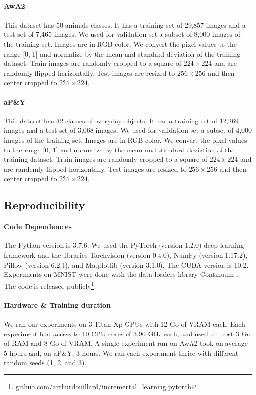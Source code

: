 \paragraph{AwA2} This dataset has 50 animals classes. It has a training set of 29,857 images and a
test set of 7,465 images. We used for validation set a subset of 8,000 images of the training set.
Images are in RGB color. We convert the pixel values to the range [0, 1] and normalize by the mean
and standard deviation of the training dataset. Train images are randomly cropped to a square of
$224\times224$ and are randomly flipped horizontally. Test images are resized to $256\times256$ and
then center cropped to $224\times224$.

\paragraph{aP\&Y} This dataset has 32 classes of everyday objects. It has a training set of 12,269
images and a test set of 3,068 images. We used for validation set a subset of 4,000 images of the
training set. Images are in RGB color. We convert the pixel values to the range [0, 1] and normalize
by the mean and standard deviation of the training dataset. Train images are randomly cropped to a
square of $224\times224$ and are randomly flipped horizontally. Test images are resized to
$256\times256$ and then center cropped to $224\times224$.

\subsection{Reproducibility}

\paragraph{Code Dependencies} The Python version is  3.7.6. We used the PyTorch
\citet{paszke2017pytorch} (version 1.2.0) deep learning framework and the libraries Torchvision
(version 0.4.0), NumPy \citet{oliphant2006numpy} (version 1.17.2), Pillow (version 6.2.1), and
Matplotlib \citet{hunter2007matplotlib} (version 3.1.0). The CUDA version is 10.2. Experiments on
MNIST were done with the data loaders library Continuum \citet{douillardlesort2021continuum}. The
code is released publicly\footnote{\href{https://github.com/arthurdouillard/incremental_learning.pytorch}{\scriptsize{github.com/arthurdouillard/incremental\_learning.pytorch}}}.

\paragraph{Hardware \& Training duration} We ran our experiments on 3 Titan Xp GPUs with 12 Go of
VRAM each. Each experiment had access to 10 CPU cores of 3.90 GHz each, and used at most 3 Go of RAM
and 8 Go of VRAM. A single experiment run on AwA2 took on average 5 hours and, on aP\&Y, 3 hours. We
ran each experiment thrice with different random seeds (1, 2, and 3).

